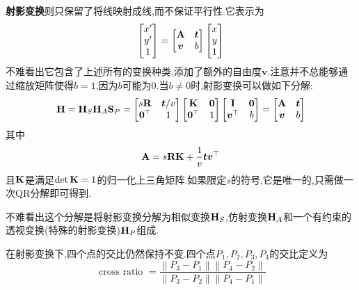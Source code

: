 \textbf{射影变换}则只保留了将线映射成线,而不保证平行性.它表示为
\begin{equation}
	\begin{bmatrix}
		x^\prime
		\\
		y^\prime
		\\
		1
	\end{bmatrix} = 
	\begin{bmatrix}
		\bold{A} & \bm t
		\\
		\bm v & b
	\end{bmatrix}
	\begin{bmatrix}
		x
		\\
		y\\
		1
	\end{bmatrix}
\end{equation}
不难看出它包含了上述所有的变换种类,添加了额外的自由度$\bm v$.注意并不总能够通过缩放矩阵使得$b = 1$,因为$b$可能为$0.$当$b \ne 0$时,射影变换可以做如下分解:
\begin{equation}
	\bold{H} = \bold{H}_S \bold{H}_A \bold{S}_P = 
		\begin{bmatrix}
			s\bold{R} & \bm t/v
			\\
			\bm 0^\top & 1
		\end{bmatrix}
		\begin{bmatrix}
			\bold{K} & \bm 0
			\\
			\bm 0^\top & 1
		\end{bmatrix}
		\begin{bmatrix}
			\bold{I} & \bm 0
			\\
			\bm v^\top & b
		\end{bmatrix}
		= 
		\begin{bmatrix}
			\bold{A} & \bm t
			\\
			\bm v & b
		\end{bmatrix}
\end{equation}
其中
\begin{equation}
	\bold{A} = s\bold{R}\bold{K} + \frac{1}{v}\bm t \bm v^\top
\end{equation}
且$\bold{K}$是满足$\det \bold{K} = 1$的归一化上三角矩阵.如果限定$s$的符号,它是唯一的,只需做一次QR分解即可得到.

不难看出这个分解是将射影变换分解为相似变换$\bold{H}_S$,仿射变换$\bold{H}_A$和一个有约束的透视变换(特殊的射影变换)$\bold{H}_P$组成.


在射影变换下,四个点的交比仍然保持不变.四个点$P_1, P_2, P_3, P_4$的交比定义为
\begin{equation}
	\text { cross ratio }=\frac{\left\|P_{3}-P_{1}\right\|\left\|P_{4}-P_{2}\right\|}{\left\|P_{3}-P_{2}\right\|\left\|P_{4}-P_{1}\right\|}
\end{equation}
